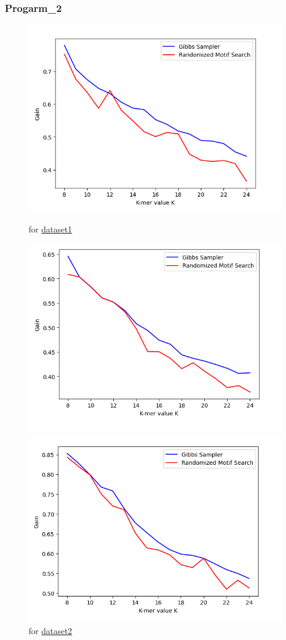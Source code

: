 \documentclass[11pt]{article}
\begin{document}
        \subsubsection{Progarm_2}
            \begin{figure}[htbp]
                \begin{minipage}[t]{0.5\columnwidth}
                    \centering
                    \includegraphics[width=0.5\columnwidth]{images/2-1.png} 
                    \caption{for \href{https://github.com/Superb-Man/Bio-Info/blob/master/data/hm03.txt}{dataset1}}
                    \label{fig:Fig-6}
                \end{minipage}
                \begin{minipage}[t]{0.5\columnwidth}
                    \centering
                    \includegraphics[width=0.5\columnwidth]{images/2-2.png} 
                    \caption{for \href{https://github.com/Superb-Man/Bio-Info/blob/master/data/yst04r.txt}{dataset2}}
                    \label{fig:Fig-7}
                \end{minipage}
                \begin{minipage}[t]{0.5\columnwidth}
                    \centering
                    \includegraphics[width=0.5\columnwidth]{images/2-3.png} 

\end{minipage}
\end{figure}
\end{document}
